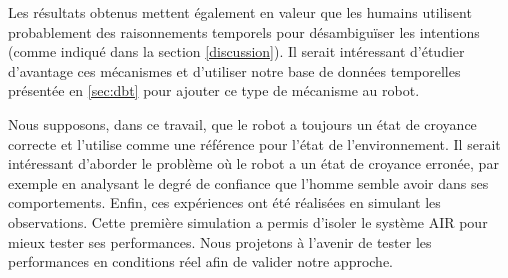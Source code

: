 \documentclass[a4paper,11pt,twoside]{StyleThese}
\begin{document}
Les résultats obtenus mettent également en valeur que les humains utilisent probablement des raisonnements temporels pour désambiguïser les intentions (comme indiqué dans la section \ref{discussion}). Il serait intéressant d'étudier d'avantage ces mécanismes et d'utiliser notre base de données temporelles présentée en \ref{sec:dbt} pour ajouter ce type de mécanisme au robot.

Nous supposons, dans ce travail, que le robot a toujours un état de croyance correcte et l'utilise comme une référence pour l'état de l'environnement. Il serait intéressant d'aborder le problème où le robot a un état de croyance erronée, par exemple en analysant le degré de confiance que l'homme semble avoir dans ses comportements. Enfin, ces expériences ont été réalisées en simulant les observations. Cette première simulation a permis d'isoler le système AIR pour mieux tester ses performances. Nous projetons à l'avenir de tester les performances en conditions réel afin de valider notre approche.






\ifdefined{}
\else


\end{document}
